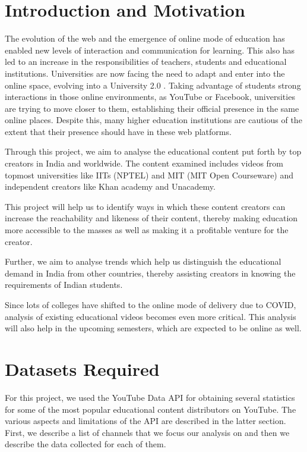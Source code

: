 \documentclass{article}
\begin{document}
\section{Introduction and Motivation}
The evolution of the web and the emergence of online mode of education has enabled new levels of interaction and communication for learning. This also has led to an increase in the responsibilities of teachers, students and educational institutions.
Universities are now facing the need to adapt and enter into the online space, evolving into a University 2.0 . Taking advantage of students strong interactions in those online environments, as YouTube or Facebook, universities are trying to move closer to them, establishing their official presence in the same online places. Despite this, many higher education institutions are cautious of the extent that their presence should have in these web platforms.

Through this project, we aim to analyse the educational content put forth by top creators in India and worldwide. The content examined includes videos from topmost universities like IITs (NPTEL) and MIT (MIT Open Courseware) and independent creators like Khan academy and Unacademy. 

This project will help us to identify ways in which these content creators can increase the reachability and likeness of their content, thereby making education more accessible to the masses as well as making it a profitable venture for the creator.

Further, we aim to analyse trends which help us distinguish the educational demand in India from other countries, thereby assisting creators in knowing the requirements of Indian students.

Since lots of colleges have shifted to the online mode of delivery due to COVID, analysis of existing educational videos becomes even more critical. This analysis will also help in the upcoming semesters, which are expected to be online as well.
\section{Datasets Required}
For this project, we used the YouTube Data API for obtaining several statistics for some of the most popular educational content distributors on YouTube. The various aspects and limitations of the API are described in the latter section. First, we describe a list of channels that we focus our analysis on and then we describe the data collected for each of them.\\
\end{document}
